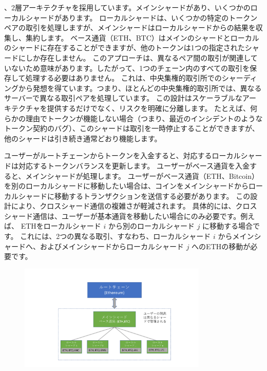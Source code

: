 、2層アーキテクチャを採用しています。メインシャードがあり、いくつかのローカルシャードがあります。 ローカルシャードは、いくつかの特定のトークンペアの取引を処理しますが、メインシャードはローカルシャードからの結果を収集し、集約します。 ベース通貨（ETH、BTC）はメインのシャードとローカルのシャードに存在することができますが、他のトークンは1つの指定されたシャードにしか存在しません。 このアプローチは、異なるペア間の取引が関連していないため意味があります。したがって、1つのチェーン内のすべての取引を保存して処理する必要はありません。 これは、中央集権的取引所でのシャーディングから発想を得ています。つまり、ほとんどの中央集権的取引所では、異なるサーバーで異なる取引ペアを処理しています。 この設計はスケーラブルなアーキテクチャを提供するだけでなく、リスクを明確に分離します。 たとえば、何らかの理由でトークンが機能しない場合（つまり、最近のインシデントのようなトークン契約のバグ）、このシャードは取引を一時停止することができますが、他のシャードは引き続き通常どおり機能します。

ユーザーがルートチェーンからトークンを入金すると、対応するローカルシャードは対応するトークンバランスを更新します。 ユーザーがベース通貨を入金すると、メインシャードが処理します。 ユーザーがベース通貨（ETH、Bitcoin）を別のローカルシャードに移動したい場合は、コインをメインシャードからローカルシャードに移動するトランザクションを送信する必要があります。 この設計により、クロスシャード通信の複雑さが軽減されます。 具体的には、クロスシャード通信は、ユーザーが基本通貨を移動したい場合にのみ必要です。例えば、 ETHをローカルシャード $i$ から別のローカルシャード $j$ に移動する場合です。 これには、2つの異なる取引、すなわち、ローカルシャード $i$ からメインシャードへ、およびメインシャードからローカルシャード $j$ へのETHの移動が必要です。

\begin{figure}[t]
  \centering
  \includegraphics[width=0.8\textwidth]{images//architecture2}
  \caption{}
  \label{architecture2}
\end{figure}

